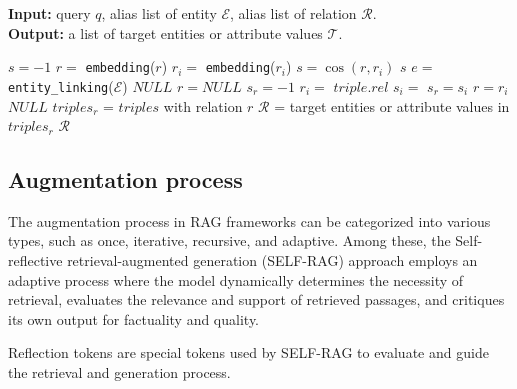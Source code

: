 \begin{algorithm}
\caption{} \label{alg:cap}
\textbf{Input:} query $q$, alias list of entity $\mathcal{E}$, alias list of relation $\mathcal{R}$. \\
\textbf{Output:} a list of target entities or attribute values $\mathcal{T}$.
\begin{algorithmic}[1]
    \State $s = -1$
    \State $r =$ \texttt{embedding}($r$)
        \State $r_i =$ \texttt{embedding}($r_i$)
            \State $s = \cos(r, r_i)$
        \EndIf
    \EndFor
    \State \Return $s$
\EndFunction
\State $e =$ \texttt{entity\_linking}($\mathcal{E}$)
    \State \Return $NULL$
\EndIf
\State $r = NULL$
\State $s_r = -1$
    \State $r_i = $  $triple.rel$
    \State $s_i =$ 
        \State $s_r = s_i$
        \State $r = r_i$
    \EndIf
\EndFor
{}
    \State \Return $NULL$
\EndIf
\State $triples_r$ = $triples$ with relation $r$
\State $\mathcal{R}$ = target entities or attribute values in $triples_r$
\State \Return $\mathcal{R}$ %
\end{algorithmic}
\end{algorithm}

\subsection{Augmentation process}

The augmentation process in RAG frameworks can be categorized into various types, such as once, iterative, recursive, and adaptive. Among these, the Self-reflective retrieval-augmented generation (SELF-RAG) \cite{asai2023selfrag} approach employs an adaptive process where the model dynamically determines the necessity of retrieval, evaluates the relevance and support of retrieved passages, and critiques its own output for factuality and quality. 

Reflection tokens are special tokens used by SELF-RAG to evaluate and guide the retrieval and generation process.

